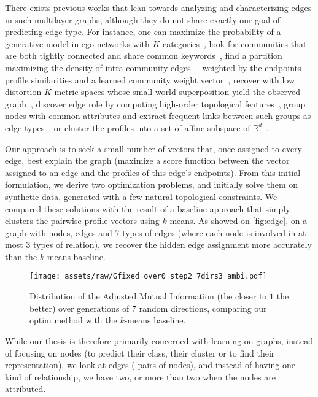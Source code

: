 There exists previous works that lean towards analyzing and characterizing edges in such multilayer
graphs, although they do not share exactly our goal of predicting edge type. For instance, one can
maximize the probability of a generative model in ego networks with $K$
categories~\autocites{LeskovecEgo12}{LeskovecEgo14}, look for communities that are both tightly
connected and share common keywords~\autocite{AttributedCommunity16}, find a partition maximizing
the density of intra community edges ---weighted by the endpoints profile similarities and a learned
community weight vector~\autocite{ZhangModelFree16}, recover with low distortion $K$ metric spaces
whose small-world superposition yield the observed graph~\autocite{Abraham2012a}, discover edge role
by computing high-order topological features~\autocite{ahmed2017roles}, group nodes with common
attributes and extract frequent links between such groups as edge types~\autocite{conceptualLinks12},
or cluster the profiles into a set of affine subspace of $\mathbb{R}^d$~\autocite{SCSurvey11}.

Our approach is to seek a small number of vectors that, once assigned to every edge, best explain
the graph (\ie maximize a score function between the vector assigned to an edge  and the profiles of
this edge's endpoints).
From this initial formulation, we derive two optimization problems, and initially solve them on
synthetic data, generated with a few natural topological constraints. We compared these solutions
with the result of a baseline approach that simply clusters the pairwise profile vectors using
$k$-means. As showed on \autoref{fig:edge}, on a graph with  nodes,  edges and 7
types of edges (where each node is involved in at most 3 types of relation), we recover the hidden
edge assignment more accurately than the $k$-means baseline.

\begin{figure}[htpb]
  \centering
  \texttt{[image: assets/raw/Gfixed\_over0\_step2\_7dirs3\_ambi.pdf]}
  \caption{Distribution of the Adjusted Mutual Information (the closer to $1$ the better) over
   generations of 7 random directions, comparing our \textsf{optim} method with the $k$-means
baseline. \label{fig:edge}}
\end{figure}

While our thesis is therefore primarily concerned with learning on graphs, instead of focusing on
nodes (to predict their class, their cluster or to find their representation), we look at edges (\ie
pairs of nodes), and instead of having one kind of relationship, we have two, or more than two when
the nodes are attributed.

